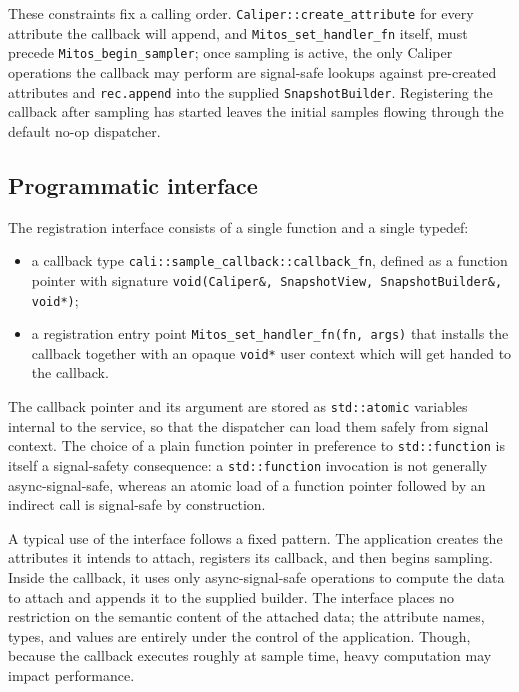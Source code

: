 These constraints fix a calling order. \texttt{Caliper::create\_attribute} for every attribute the callback will append, and \texttt{Mitos\_set\_handler\_fn} itself, must precede \texttt{Mitos\_begin\_sampler}; once sampling is active, the only Caliper operations the callback may perform are signal-safe lookups against pre-created attributes and \texttt{rec.append} into the supplied \texttt{SnapshotBuilder}. Registering the callback after sampling has started leaves the initial samples flowing through the default no-op dispatcher.

\subsection{Programmatic interface}\label{subsec:sample-callback-api}

The registration interface consists of a single function and a single typedef:
\begin{itemize}
    \item a callback type \texttt{cali::sample\_callback::callback\_fn}, defined as a function pointer with signature \texttt{void(Caliper\&, SnapshotView, SnapshotBuilder\&, void*)};
    \item a registration entry point \texttt{Mitos\_set\_handler\_fn(fn, args)} that installs the callback together with an opaque \texttt{void*} user context which will get handed to the callback.
\end{itemize}
The callback pointer and its argument are stored as \texttt{std::atomic} variables internal to the service, so that the dispatcher can load them safely from signal context. The choice of a plain function pointer in preference to \texttt{std::function} is itself a signal-safety consequence: a \texttt{std::function} invocation is not generally async-signal-safe, whereas an atomic load of a function pointer followed by an indirect call is signal-safe by construction.

A typical use of the interface follows a fixed pattern. The application creates the attributes it intends to attach, registers its callback, and then begins sampling. Inside the callback, it uses only async-signal-safe operations to compute the data to attach and appends it to the supplied builder. The interface places no restriction on the semantic content of the attached data; the attribute names, types, and values are entirely under the control of the application. Though, because the callback executes roughly at sample time, heavy computation may impact performance.

